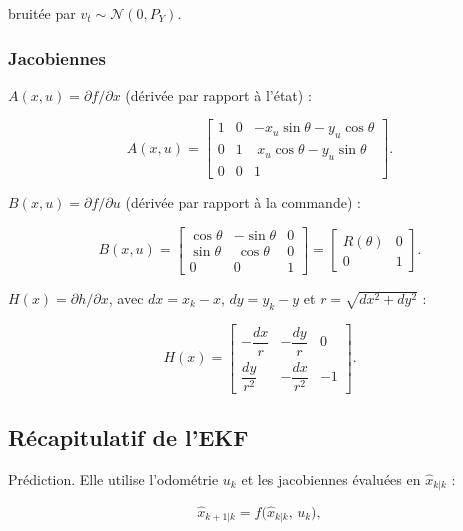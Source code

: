 \documentclass[11pt]{article}
\theoremstyle{remark}
\theoremstyle{definition}
\begin{document}
bruitée par $v_t \sim \mathcal{N}(0, P_Y)$.

\subsubsection{Jacobiennes}

$A(x,u) = \partial f / \partial x$ (dérivée par rapport à l'état) :

\begin{equation}
A(x,u) =
\begin{bmatrix}
1 & 0 & -x_u\sin\theta - y_u\cos\theta \\[2pt]
0 & 1 & \ x_u\cos\theta - y_u\sin\theta \\[2pt]
0 & 0 & 1
\end{bmatrix}.
\end{equation}

$B(x,u) = \partial f / \partial u$ (dérivée par rapport à la commande) :

\begin{equation}
B(x,u) =
\begin{bmatrix}
\cos\theta & -\sin\theta & 0 \\[2pt]
\sin\theta & \ \cos\theta & 0 \\[2pt]
0 & 0 & 1
\end{bmatrix}
=
\begin{bmatrix}
R(\theta) & 0 \\[2pt]
0 & 1
\end{bmatrix}.
\end{equation}

$H(x) = \partial h / \partial x$, avec $dx = x_k - x$, $dy = y_k - y$ et
$r = \sqrt{dx^2 + dy^2}$ :

\begin{equation}
H(x) =
\begin{bmatrix}
-\dfrac{dx}{r} & -\dfrac{dy}{r} & 0 \\[8pt]
\dfrac{dy}{r^2} & -\dfrac{dx}{r^2} & -1
\end{bmatrix}.
\end{equation}

\subsection{Récapitulatif de l'EKF}

Prédiction. Elle utilise l'odométrie $u_k$ et les jacobiennes évaluées en
$\hat{x}_{k|k}$ :

\begin{equation}
\hat{x}_{k+1|k} = f\big(\hat{x}_{k|k},\, u_k\big),
\end{equation}
\end{document}
